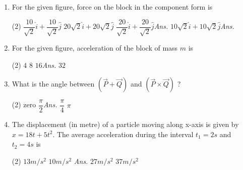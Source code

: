 \documentclass{article}
\newcommand{\ans}{\textcolor{red!95}{\textit{\quad Ans.}}}
\begin{document}
\begin{enumerate}
	\item For the given figure, force on the block in the component form is
	\begin{center}
	\end{center}
	\begin{tasks}(2)
		\task $\dfrac{10}{\sqrt{2}}\hat{i}+\dfrac{10}{\sqrt{2}}\hat{j}$
		\task $20\sqrt{2}\hat{i}+20\sqrt{2}\hat{j}$
		\task $\dfrac{20}{\sqrt{2}}\hat{i}+\dfrac{20}{\sqrt{2}}\hat{j}$\ans
		\task $10\sqrt{2}\hat{i}+10\sqrt{2}\hat{j}$\ans
	\end{tasks}
	
	\item For the given figure, acceleration of the block of mass $m$ is
	\begin{center}
	\end{center}
	\begin{tasks}(2)
		\task $4$
		\task $8$
		\task $16$\ans
		\task $32$
	\end{tasks}
	
\item What is the angle between $(\vec{P}+\vec{Q})$ and $(\vec{P}\times\vec{Q})$ ?
\begin{tasks}(2)
	\task zero
	\task $\dfrac{\pi}{2}$\ans
    \task $\dfrac{\pi}{4}$
	\task $\pi$
\end{tasks}

\item The displacement (in metre) of a particle moving along x-axis is given by $x=18t+5t^2$. The average acceleration during the interval $t_1=2 s$ and $t_2=4 s$ is
    \begin{tasks}(2)
            \task $13 m/s^2$
            \task $10 m/s^2$ \ans
            \task $27 m/s^2$
            \task $37 m/s^2$
    \end{tasks}


\end{enumerate}
\end{document}
